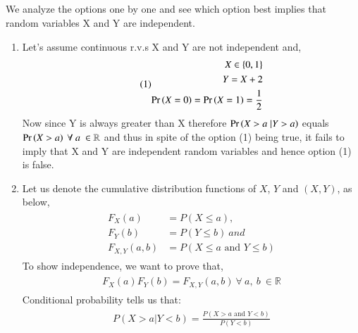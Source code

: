 \documentclass[journal,12pt,twocolumn]{IEEEtran}
\begin{document}
\subsection*{}
We analyze the options one by one and see which option best implies that random variables X and Y are independent. \\
\begin{enumerate}
    \item Let's assume continuous r.v.s X and Y are not independent and, \\
\begin{align}\tag{1}
    \begin{split}
        X \in \{0, 1\}\\
        Y = X + 2\\
        \Pr\left(X=0\right) = \Pr\left(X=1\right) = \dfrac{1}{2}\\
    \end{split}
\end{align}
Now since Y is always greater than X therefore $\Pr\left(X>a \;| Y>a\right)$ equals $\Pr\left(X > a\right)\ \forall\ a\ \in \mathbb{R}$ and thus in spite of the option (1) being true, it fails to imply that X and Y are independent random variables and hence option (1) is false.\\
    \item Let us denote the cumulative distribution functions of $X$, $Y$ and $(X, Y)$, as below,\\
\begin{align}\tag{2}
    \begin{split}
        F_X(a) &= P(X \leq a),\\
        F_Y(b) &= P(Y \leq b)\ and \\
        F_{X,Y}(a,b) &= P(X \leq a \mbox{ and } Y \leq b) 
    \end{split}
\end{align}
To show independence, we want to prove that,
\begin{align}\tag{3}
    \begin{split}
        F_X(a)F_Y(b) = F_{X, Y}(a,b)\ \forall\ a,\ b\ \in \mathbb{R}
    \end{split}
\end{align}
Conditional probability tells us that: 
\begin{align}\tag{4}
    \begin{split}
        P(X > a | Y < b) = \frac{P(X > a \mbox{ and } Y < b)}{P(Y < b)}
    \end{split}
\end{align}

\end{enumerate}
\end{document}
